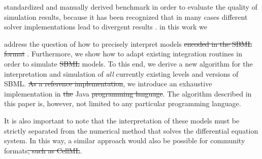 \documentclass[10pt]{bmc_article}
\newenvironment{bmcformat}{\fussy\setboolean{publ}{true}}{\fussy}
\begin{document}
\begin{bmcformat}
 standardized and manually derived benchmark
 in order to evaluate the quality of simulation results, because it
has been recognized that in many cases different solver implementations lead to
divergent results \cite{Bergmann2008}.
in this work we
 
 address the question of how to precisely interpret  models
\sout{encoded in the \acs{SBML} format} .
Furthermore, we show how to adapt existing  integration routines
in order to simulate \sout{\acs{SBML}} models.
To this end, we derive a new algorithm for the  interpretation and 
simulation of \emph{all} currently existing levels and versions of \acs{SBML}.
\sout{As a reference implementation},
we introduce an exhaustive  implementation in \sout{the}
Java\texttrademark{} \sout{programming language}. The algorithm described in this paper
is, however, not limited to any particular programming language.

It is also important to note that the interpretation of these models must be strictly
separated from the numerical method that solves the  differential
equation system. In this way, a similar approach would also be possible for
 community formats\sout{, such as CellML}.


\end{bmcformat}
\end{document}
